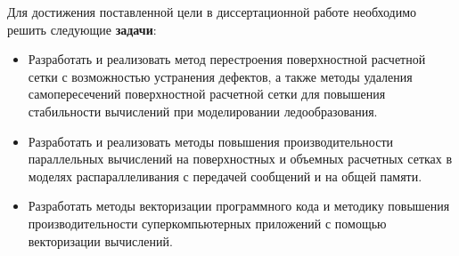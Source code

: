 Для достижения поставленной цели в диссертационной работе необходимо решить следующие \textbf{задачи}:
\begin{itemize}[noitemsep,topsep=0pt,parsep=0pt,partopsep=0pt]
\item Разработать и реализовать метод перестроения поверхностной расчетной сетки с возможностью устранения дефектов, а также методы удаления самопересечений поверхностной расчетной сетки для повышения стабильности вычислений при моделировании ледообразования.
\item Разработать и реализовать методы повышения производительности параллельных вычислений на поверхностных и объемных расчетных сетках в моделях распараллеливания с передачей сообщений и на общей памяти.
\item Разработать методы векторизации программного кода и методику повышения производительности суперкомпьютерных приложений с помощью векторизации вычислений.
\end{itemize}